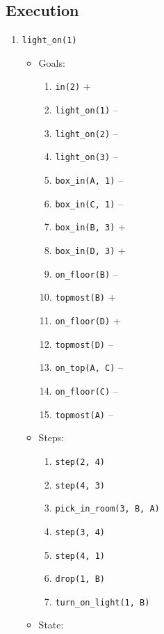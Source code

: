 \documentclass[12pt]{article}
\begin{document}
\subsection{Execution}
\begin{enumerate}
  \item \texttt{light\_on(1)}
    \begin{itemize}
      \item Goals:
        \begin{enumerate}
          \item \texttt{in(2)} +
          \item \texttt{light\_on(1)} --
          \item \texttt{light\_on(2)} --
          \item \texttt{light\_on(3)} --
          \item \texttt{box\_in(A, 1)} --
          \item \texttt{box\_in(C, 1)} --
          \item \texttt{box\_in(B, 3)} +
          \item \texttt{box\_in(D, 3)} +
          \item \texttt{on\_floor(B)} --
          \item \texttt{topmost(B)} +
          \item \texttt{on\_floor(D)} +
          \item \texttt{topmost(D)} --
          \item \texttt{on\_top(A, C)} --
          \item \texttt{on\_floor(C)} --
          \item \texttt{topmost(A)} --
        \end{enumerate}
      \item Steps:
        \begin{enumerate}
          \item \texttt{step(2, 4)}
          \item \texttt{step(4, 3)}
          \item \texttt{pick\_in\_room(3, B, A)}
          \item \texttt{step(3, 4)}
          \item \texttt{step(4, 1)}
          \item \texttt{drop(1, B)}
          \item \texttt{turn\_on\_light(1, B)}
        \end{enumerate}
      \item State:
        \begin{itemize}

\end{itemize}
\end{itemize}
\end{enumerate}
\end{document}
